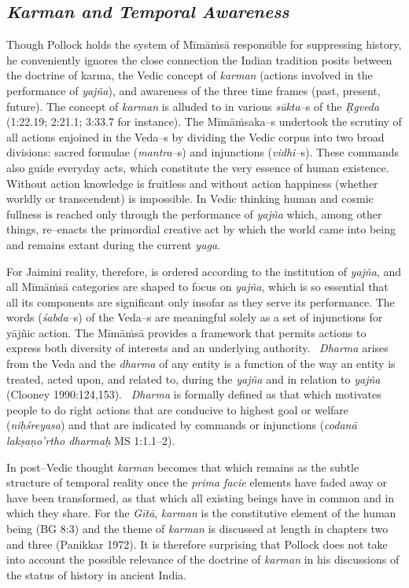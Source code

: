 \subsection*{\textit{Karman and Temporal Awareness}}

Though Pollock holds the system of Mīmāṁsā responsible for suppressing history, he conveniently ignores the close connection the Indian tradition posits between the doctrine of karma, the Vedic concept of \textit{karman} (actions involved in the performance of \textit{yajña}), and awareness of the three time frames (past, present, future). The concept of \textit{karman} is alluded to in various \textit{sūkta–}s of the \textit{Ṛgveda} (1:22.19; 2:21.1; 3:33.7 for instance). The Mīmāṁsaka–s undertook the scrutiny of all actions enjoined in the Veda–s by dividing the Vedic corpus into two broad divisions: sacred formulae (\textit{mantra}–s) and injunctions (\textit{vidhi–}s). These commands also guide everyday acts, which constitute the very essence of human existence. Without action knowledge is fruitless and without action happiness (whether worldly or transcendent) is impossible. In Vedic thinking human and cosmic fullness is reached only through the performance of \textit{yajña} which, among other things, re–enacts the primordial creative act by which the world came into being and remains extant during the current \textit{yuga}.

For Jaimini reality, therefore, is ordered according to the institution of \textit{yajña}, and all Mīmāṁsā categories are shaped to focus on \textit{yajña}, which is so essential that all its components are significant only insofar as they serve its performance. The words (\textit{śabda–}s) of the Veda–s are meaningful solely as a set of injunctions for yājñic action. The Mīmāṁsā provides a framework that permits actions to express both diversity of interests and an underlying authority.  \textit{Dharma} arises from the Veda and the \textit{dharma} of any entity is a function of the way an entity is treated, acted upon, and related to, during the \textit{yajña} and in relation to \textit{yajña} (Clooney 1990:124,153).  \textit{Dharma} is formally defined as that which motivates people to do right actions that are conducive to highest goal or welfare (\textit{niḥśreyasa}) and that are indicated by commands or injunctions (\textit{codanā lakṣaṇo'rtho dharmaḥ} MS 1:1.1–2).

In post–Vedic thought \textit{karman} becomes that which remains as the subtle structure of temporal reality once the \textit{prima facie} elements have faded away or have been transformed, as that which all existing beings have in common and in which they share. For the \textit{Gītā}, \textit{karman} is the constitutive element of the human being (BG 8:3) and the theme of \textit{karman} is discussed at length in chapters two and three (Panikkar 1972). It is therefore surprising that Pollock does not take into account the possible relevance of the doctrine of \textit{karman} in his discussions of the status of history in ancient India.


